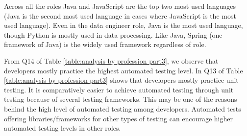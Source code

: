Across all the roles Java and JavaScript are the top two most used languages (Java is the second most used language in cases where JavaScript is the most used language). Even in the data engineer role, Java is the most used language, though Python is mostly used in data processing. Like Java, Spring (one framework of Java) is the widely used framework regardless of role.

From Q14 of Table \ref{table:analysis by profession part3}, we observe that developers mostly practice the highest automated testing level. In Q13 of Table \ref{table:analysis by profession part3} shows that developers mostly practice unit testing. It is comparatively easier to achieve automated testing through unit testing because of several testing frameworks. This may be one of the reasons behind the high level of automated testing among developers. Automated tests offering libraries/frameworks for other types of testing can encourage higher automated testing levels in other roles.
